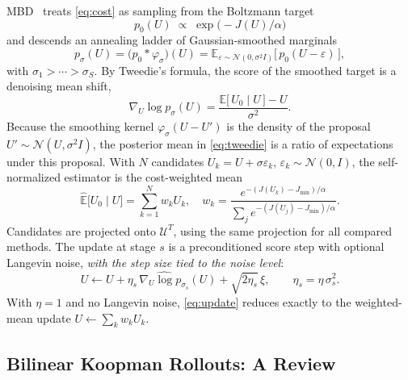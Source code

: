\documentclass[letterpaper,10pt,conference]{ieeeconf}
\begin{document}
MBD~\cite{pan2024model} treats \eqref{eq:cost} as sampling from the Boltzmann target
\begin{equation}
p_0(U) \;\propto\; \exp\!\big(-J(U)/\alpha\big)
\label{eq:target}
\end{equation}
and descends an annealing ladder of Gaussian-smoothed marginals
\begin{equation}
p_{\sigma}(U) = \big(p_0 * \varphi_{\sigma}\big)(U)
= \mathbb{E}_{\varepsilon \sim \mathcal{N}(0, \sigma^{2} I)}
\big[\, p_0(U - \varepsilon) \,\big],
\label{eq:smooth}
\end{equation}
with $\sigma_1 > \cdots > \sigma_S$.
By Tweedie's formula, the score of the smoothed target is a denoising mean shift,
\begin{equation}
\nabla_U \log p_{\sigma}(U)
= \frac{\mathbb{E}\big[\,U_0 \mid U\,\big] - U}{\sigma^{2}} .
\label{eq:tweedie}
\end{equation}
Because the smoothing kernel $\varphi_\sigma(U-U')$ is the density of the proposal $U' \sim \mathcal{N}(U,\sigma^2 I)$, the posterior mean in \eqref{eq:tweedie} is a ratio of expectations under this proposal. With $N$ candidates $U_k=U+\sigma\varepsilon_k$, $\varepsilon_k\sim\mathcal{N}(0,I)$, the self-normalized estimator is the cost-weighted mean
\begin{equation}
\widehat{\mathbb{E}}\big[U_0 \mid U\big] = \sum_{k=1}^{N} w_k U_k,
\quad
w_k = \frac{e^{-(J(U_k) - J_{\min})/\alpha}}
           {\sum_{j} e^{-(J(U_j) - J_{\min})/\alpha}} .
\label{eq:weights}
\end{equation}
Candidates are projected onto $\mathcal{U}^{T}$, using the same projection for all compared methods.
The update at stage $s$ is a preconditioned score step with optional Langevin noise, \emph{with the step size tied to the noise level}:
\begin{equation}
U \leftarrow U + \eta_s\, \widehat{\nabla_U \log p_{\sigma_s}}(U)
+ \sqrt{2 \eta_s}\, \xi,
\qquad
\eta_s = \eta\, \sigma_s^{2} .
\label{eq:update}
\end{equation}
With $\eta = 1$ and no Langevin noise, \eqref{eq:update} reduces exactly to the weighted-mean update $U \leftarrow \sum_k w_k U_k$.

\subsection{Bilinear Koopman Rollouts: A Review}\label{subsec:koopman}
\end{document}
